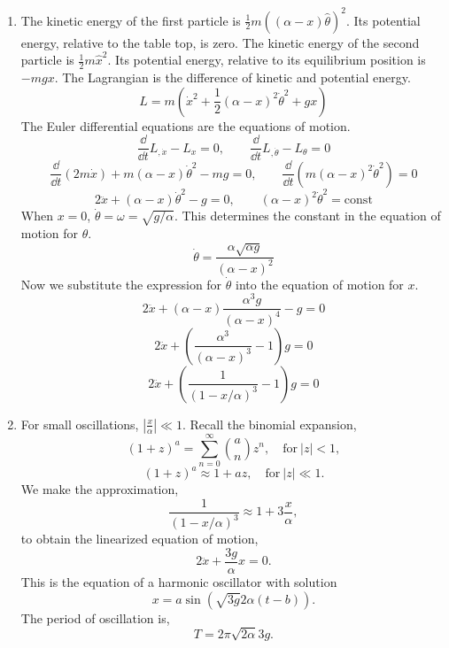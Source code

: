 \begin{Solution}
  \begin{enumerate}
  \item
    The kinetic energy of the first particle is 
    $\frac{1}{2} m ((\alpha - x) \hat{\theta} )^2$.  Its potential energy, relative
    to the table top, is zero.  The kinetic energy of the second particle is
    $\frac{1}{2} m \hat{x}^2$.  Its potential energy, relative to its equilibrium
    position is $-m g x$.  The Lagrangian is the difference of kinetic and 
    potential energy.
    \[
    \boxed{
      L = m \left( \dot{x}^2 + \frac{1}{2} (\alpha - x)^2 \dot{\theta}^2 + g x
      \right)
      }
    \]
    The Euler differential equations are the equations of motion.
    \[
    \frac{\dd}{\dd t} L_{,\dot{x}} - L_x = 0, \qquad
    \frac{\dd}{\dd t} L_{,\dot{\theta}} - L_\theta = 0
    \]
    \[
    \frac{\dd}{\dd t} ( 2 m \dot{x} ) + m (\alpha - x) \dot{\theta}^2 - m g = 0, 
    \qquad
    \frac{\dd}{\dd t} \left( m (\alpha - x)^2 \dot{\theta}^2 \right) = 0
    \]
    \[
    2 \ddot{x} + (\alpha - x) \dot{\theta}^2 - g = 0, 
    \qquad
    (\alpha - x)^2 \dot{\theta}^2 = \mathrm{const}
    \]
    When $x =0$, $\dot{\theta} = \omega = \sqrt{g/\alpha}$.  This determines the
    constant in the equation of motion for $\theta$.
    \[
    \boxed{
      \dot{\theta} = \frac{ \alpha \sqrt{\alpha g} }{ (\alpha - x)^2 }
      }
    \]
    Now we substitute the expression for $\dot{\theta}$ into the equation of
    motion for $x$.
    \[
    2 \ddot{x} + (\alpha - x) \frac{\alpha^3 g}{(\alpha-x)^4} - g = 0
    \]
    \[
    2 \ddot{x} + \left( \frac{\alpha^3}{(\alpha-x)^3} - 1 \right) g = 0
    \]
    \[
    \boxed{
      2 \ddot{x} + \left( \frac{1}{(1-x/\alpha)^3} - 1 \right) g = 0
      }
    \]
  \item
    For small oscillations, $\left| \frac{x}{\alpha} \right| \ll 1$.  Recall
    the binomial expansion,
    \[
    (1 + z)^a = \sum_{n = 0}^\infty \binom{a}{n} z^n, \quad \mathrm{for}\ |z| < 1,
    \]
    \[
    (1 + z)^a \approx 1 + a z, \quad \mathrm{for}\ |z| \ll 1.
    \]
    We make the approximation,
    \[
    \frac{1}{(1 - x/\alpha)^3} \approx 1 + 3 \frac{x}{\alpha},
    \]
    to obtain the linearized equation of motion,
    \[
    2 \ddot{x} + \frac{3 g}{\alpha} x = 0.
    \]
    This is the equation of a harmonic oscillator with solution
    \[
    x = a \sin \left( \sqrt{3 g}{2 \alpha} (t - b) \right).
    \]
    The period of oscillation is,
    \[
    \boxed{
      T = 2 \pi \sqrt{2 \alpha}{3 g}.
      }
    \]
  \end{enumerate}
\end{Solution}



